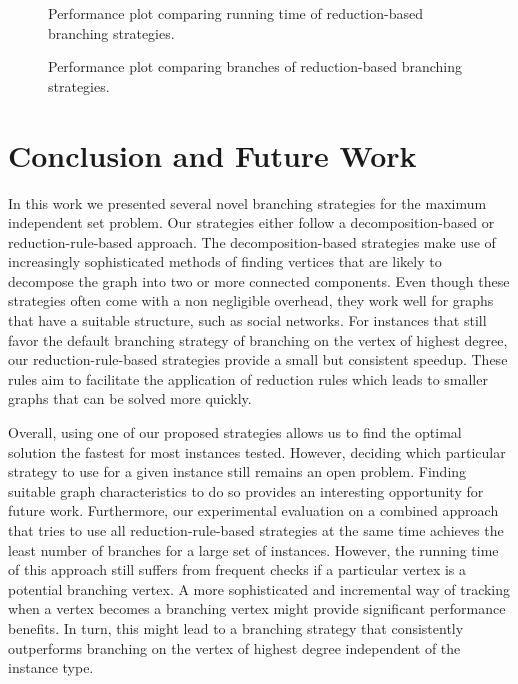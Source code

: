 \documentclass[a4paper,UKenglish,cleveref, autoref, thm-restate]{lipics-v2021}
\begin{document}

\begin{figure}[t]
	\centering
	
	\caption{Performance plot comparing running time of reduction-based branching strategies.}\label{fig:all_reduction_time}
\end{figure}

\begin{figure}[tb!]
	\centering
	
	\caption{Performance plot comparing branches of reduction-based branching strategies.}\label{fig:all_reduction_branch}
\end{figure}


\section{Conclusion and Future Work}
In this work we presented several novel branching strategies for the maximum independent set problem.
Our strategies either follow a decomposition-based or reduction-rule-based approach.
The decomposition-based strategies make use of increasingly sophisticated methods of finding vertices that are likely to decompose the graph into two or more connected components.
Even though these strategies often come with a non negligible overhead, they work well for graphs that have a suitable structure, such as social networks.
For instances that still favor the default branching strategy of branching on the vertex of highest degree, our reduction-rule-based strategies provide a small but consistent speedup.
These rules aim to facilitate the application of reduction rules which leads to smaller graphs that can be solved more quickly.

Overall, using one of our proposed strategies allows us to find the optimal solution the fastest for most instances tested.
However, deciding which particular strategy to use for a given instance still remains an open problem.
Finding suitable graph characteristics to do so provides an interesting opportunity for future work.
Furthermore, our experimental evaluation on a combined approach that tries to use all reduction-rule-based strategies at the same time achieves the least number of branches for a large set of instances.
However, the running time of this approach still suffers from frequent checks if a particular vertex is a potential branching vertex.
A more sophisticated and incremental way of tracking when a vertex becomes a branching vertex might provide significant performance benefits.
In turn, this might lead to a branching strategy that consistently outperforms branching on the vertex of highest degree independent of the instance type.
\end{document}
